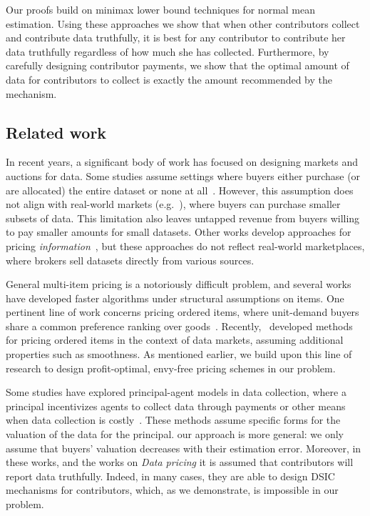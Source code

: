 Our proofs build on minimax lower bound techniques for normal mean estimation.  
Using these approaches we show that when other contributors collect and contribute data truthfully, it is best for any contributor to contribute her data truthfully regardless of how much she has collected. Furthermore, by carefully designing contributor payments, we show that the optimal amount of data for contributors to collect is exactly the amount recommended by the mechanism.



\subsection{Related work}
\label{sec:relatedwork}

In recent years, a significant body of work has focused on designing markets and auctions for data. Some studies assume settings where buyers either purchase (or are allocated) the entire dataset or none at all~\citep{agarwal2020towards,agarwal2019marketplace,bergemann2019markets,chen2023equilibrium}. However, this assumption does not align with real-world markets (e.g.~\citep{snowflake,awsdataexchange,citrine,bloombergeap}), where buyers can purchase smaller subsets of data. This limitation also leaves untapped revenue from buyers willing to pay smaller amounts for small datasets. Other works develop approaches for pricing \emph{information}~\citep{bergemann2018design,babaioff2012optimal,mehta2021sell,pei2020survey}, but these approaches do not reflect real-world marketplaces, where brokers sell datasets directly from various sources.


General multi-item pricing is a notoriously difficult problem, and several works have developed faster algorithms under structural assumptions on items. One pertinent line of work concerns pricing ordered items, where unit-demand buyers share a common preference ranking over goods~\citep{chawla2022pricing,hartline2005near}. Recently,~\citet{chen2024learning} developed methods for pricing ordered items in the context of data markets, assuming additional properties such as smoothness. As mentioned earlier, we build upon this line of research to design profit-optimal, envy-free pricing schemes in our problem.

Some studies have explored principal-agent models in data collection, where a principal incentivizes agents to collect data through payments or other means when data collection is costly~\citep{cai2015optimum,huang2023evaluating}.
These methods assume specific forms for the valuation of the data for the principal. our approach is more general: we only assume that buyers' valuation decreases with their estimation error.
Moreover, in these works, and the works on \emph{Data pricing} it is assumed that  contributors will report data truthfully. Indeed, in many cases, they are able to design DSIC mechanisms for contributors, which, as we demonstrate, is impossible in our problem.




